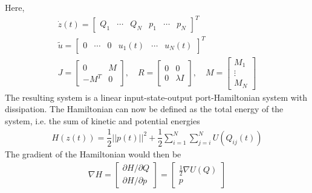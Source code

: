 Here,
\begin{gather}
    \dot z(t) = 
    \begin{bmatrix}
        Q_1 & \cdots & Q_N & p_1 & \cdots & p_N 
    \end{bmatrix}^T
    \\
    \tilde u = \begin{bmatrix} 0 & \cdots & 0 & u_1(t) & \cdots & u_N(t) \end{bmatrix}^T
    \\
    J =
    \begin{bmatrix}
        0 & M \\
        -M^T & 0 
    \end{bmatrix},
    \quad 
    R =
    \begin{bmatrix}
        0 & 0 \\
        0 & \lambda I
    \end{bmatrix},
    \quad
    M = 
    \begin{bmatrix}
        M_1 \\ \vdots \\ M_N
    \end{bmatrix}
    \label{eq:JRM}
\end{gather}
The resulting system is a linear input-state-output port-Hamiltonian system with dissipation. The Hamiltonian can now be defined as the total energy of the system, i.e. the sum of kinetic and potential energies
\begin{align}
    H(z(t)) = \dfrac{1}{2}||p(t)||^2 + \dfrac{1}{2}\sum_{i=1}^N\sum_{j=i}^NU(Q_{ij}(t))
    \label{eq:Hamiltonian}
\end{align}
The gradient of the Hamiltonian would then be
\begin{gather}
    \nabla H = 
    \begin{bmatrix}
        \partial H / \partial Q \\ \partial H / \partial p
    \end{bmatrix} =
    \begin{bmatrix}
        \frac{1}{2}\nabla U(Q) \\ p
    \end{bmatrix} 
    \label{eq:Hamiltonian_partial}
\end{gather}

